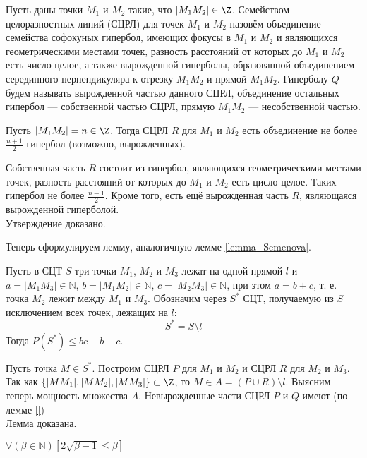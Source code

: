 \begin{opr}
	Пусть даны точки $M_1$ и $M_2$ такие, что $|M_1 M_2|\in\Z$.
	Семейством целоразностных линий (СЦРЛ) для точек $M_1$ и $M_2$ назовём объединение семейства софокуных гипербол,
	имеющих фокусы в $M_1$ и $M_2$ и являющихся геометрическими местами точек, разность расстояний от которых до $M_1$ и $M_2$ есть число целое,
	а также вырожденной гиперболы,
	образованной объединением серединного перпендикуляра к отрезку $M_1 M_2$ и прямой $M_1 M_2$.
	Гиперболу $Q$ будем называть вырожденной частью данного СЦРЛ,
	объединение остальных гипербол --- собственной частью СЦРЛ,
	прямую $M_1 M_2$ --- несобственной частью.
\end{opr}

\begin{utverzhd}
	Пусть $|M_1 M_2|= n \in\Z$.
	Тогда СЦРЛ $R$ для $M_1$ и $M_2$ есть объединение не более $\frac{n+1}{2}$ гипербол (возможно, вырожденных).
\end{utverzhd}

\dokvo
	Собственная часть $R$ состоит из гипербол, являющихся геометрическими местами точек,
	разность расстояний от которых до $M_1$ и $M_2$ есть цисло целое.
	Таких гипербол не более $\frac{n-1}{2}$.
	Кроме того, есть ещё вырожденная часть $R$, являющаяся вырожденной гиперболой.
\\ Утверждение доказано.

Теперь сформулируем лемму, аналогичную лемме \ref{lemma_Semenova}.

\begin{lemma}
	Пусть в СЦТ $S$ три точки $M_1$, $M_2$ и $M_3$ лежат на одной прямой $l$ и 
	$a=|M_1 M_3| \in \mathbb{N}$,
	$b=|M_1 M_2| \in \mathbb{N}$,
	$c=|M_2 M_3| \in \mathbb{N}$,
	при этом $a=b+c$, т. е. точка $M_2$ лежит между $M_1$ и $M_3$.
	Обозначим через $S^*$ СЦТ, получаемую из $S$ исключением всех точек, лежащих на $l$:
	$$
		S^* = S \setminus l
	$$
	Тогда
	$P(S^*) \leq bc-b-c$.
\end{lemma}

\dokvo
	Пусть точка $M \in S^*$.
	Построим СЦРЛ $P$ для $M_1$ и $M_2$ и СЦРЛ $R$ для $M_2$ и $M_3$.
	Так как $\{|M M_1|,|M M_2|,|M M_3|\}\subset\Z$, то $M\in A = (P\cup R)\setminus l$.
	Выясним теперь мощность множества $A$.
	Невырожденные части СЦРЛ $P$ и $Q$ имеют (по лемме \ref{})
\\ Лемма доказана.


\begin{utverzhd}[вспомогательное]
	$\forall \left(\beta \in \mathbb N\right)\left[  2 \sqrt{\beta - 1} \leq \beta \right]$
\end{utverzhd}

